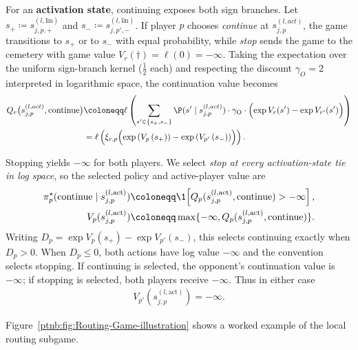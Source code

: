 \begin{definition}
For an \textbf{activation state}, continuing exposes both sign branches. Let $s_+ \coloneqq
    s_{j,p,+}^{(l, \text{lin})}$ and $s_- \coloneqq s_{j,p',-}^{(l, \text{lin})}$. If player $p$
chooses \emph{continue} at $s_{j,p}^{(l, act)}$, the game transitions to $s_+$ or to $s_-$ with
equal probability, while \emph{stop} sends the game to the cemetery with game value
$V_r(\dagger)=\ell(0)=-\infty$. Taking the expectation over the uniform sign-branch kernel
($\frac{1}{2}$ each) and respecting the discount $\gamma_O = 2$ interpreted in logarithmic space,
the continuation value becomes
\begin{align}\label{ptnb:eq:routing-activation-continue}
    Q_r \bigl( s_{j,p}^{(l, act)}, \mathrm{continue} \bigr)
    &\coloneqq
    \ell \left( \sum_{s' \in \{s_+, s_-\}} \P(s' \mid s_{j,p}^{(l, act)}) \cdot \gamma_{\mathrm{O}}
    \cdot \Bigl( \exp V_r(s') - \exp V_{r'}(s') \Bigr) \right) \nonumber \\
    &= \ell \left(
    \xi_{r,p} \Bigl( \exp\left( V_p\left( s_+ \right) \right) - \exp\left( V_{p'}\left( s_- \right)
    \right) \Bigr)
    \right).
\end{align}

Stopping yields $-\infty$ for both players. We select \emph{stop at every activation-state tie in log space}, so the selected policy and active-player value are
\begin{align}\label{ptnb:eq:routing-activation-value}
    \pi_p^\star(\mathrm{continue}\mid s_{j,p}^{(l,\mathrm{act})})
    &\coloneqq \1\!\left[Q_p(s_{j,p}^{(l,\mathrm{act})},\mathrm{continue})>-\infty\right],\\
    V_p(s_{j,p}^{(l,\mathrm{act})})
    &\coloneqq \max\{-\infty,Q_p(s_{j,p}^{(l,\mathrm{act})},\mathrm{continue})\}.
\end{align}
Writing $D_p=\exp V_p(s_+)-\exp V_{p'}(s_-)$, this selects continuing exactly when $D_p>0$. When $D_p\leq0$, both actions have log value $-\infty$ and the convention selects stopping. If continuing is selected, the opponent's continuation value is $-\infty$; if stopping is selected, both players receive $-\infty$. Thus in either case
\begin{align}
    V_{p'}(s_{j,p}^{(l,\mathrm{act})})=-\infty.
\end{align}
\end{definition}
Figure~\ref{ptnb:fig:Routing-Game-illustration} shows a worked example of the local routing subgame.

